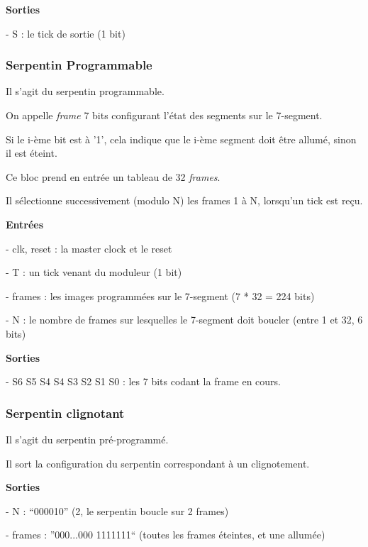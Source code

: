 \documentclass[10pt]{article}
\begin{document}
        \textbf{Sorties}
            
            - S : le tick de sortie (1 bit)
        
        \subsubsection{Serpentin Programmable}
        
        Il s'agit du serpentin programmable.
        
        On appelle \textit{frame} 7 bits configurant l'état des segments sur le 7-segment.

        Si le i-ème bit est à '1', cela indique que le i-ème segment doit être allumé, sinon il est éteint.
        
        Ce bloc prend en entrée un tableau de 32 \textit{frames}.
        
        Il sélectionne successivement (modulo N) les frames 1 à N, lorsqu'un tick est reçu.

        \textbf{Entrées}
        
            - clk, reset : la master clock et le reset

            - T : un tick venant du moduleur (1 bit)
            
            - frames : les images programmées sur le 7-segment (7 * 32 = 224 bits)
            
            - N : le nombre de frames sur lesquelles le 7-segment doit boucler (entre 1 et 32, 6 bits)
            
        \textbf{Sorties}
            
            - S6 S5 S4 S4 S3 S2 S1 S0 : les 7 bits codant la frame en cours.
        
        \subsubsection{Serpentin clignotant}
        
        Il s'agit du serpentin pré-programmé.
        
        Il sort la configuration du serpentin correspondant à un clignotement.
        
        \textbf{Sorties}
            
            - N : ``000010'' (2, le serpentin boucle sur 2 frames)
            
            - frames : ''000...000 1111111`` (toutes les frames éteintes, et une allumée)
        
\end{document}
